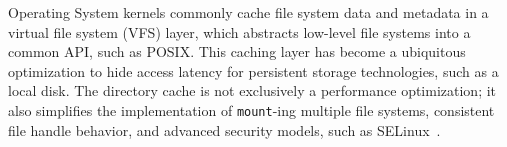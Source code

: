 
Operating System kernels commonly cache file system data and metadata in 
a virtual file system (VFS) layer, which abstracts low-level file systems into a common API, 
such as POSIX.  
This caching layer has become a ubiquitous optimization
to hide access latency for 
persistent storage technologies, such as a local disk.
The directory cache is not exclusively a performance optimization; it also simplifies 
the implementation of {\tt mount}-ing multiple file systems, 
consistent file handle behavior,
and advanced security 
models, such as SELinux~\citep{selinux}.







